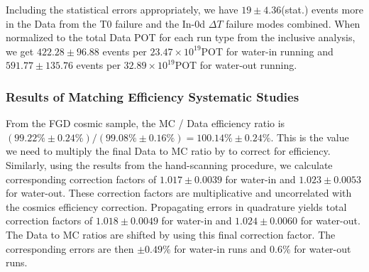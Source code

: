 Including the statistical errors appropriately, we have $19\pm 4.36$(stat.) events more in the Data from the T0 failure and the In-\p0d $\Delta T$ failure modes combined. When normalized to the total Data POT for each run type from the inclusive analysis, we get $422.28 \pm 96.88$  events per $23.47\times 10^{19}$POT for water-in running and $591.77 \pm 135.76$  events per $32.89\times 10^{19}$POT for water-out running.

\subsubsection{Results of Matching Efficiency Systematic Studies}
\label{sec:Systematics_MatchingEfficiencyResults}

From the FGD cosmic sample, the MC / Data efficiency ratio is $(99.22\%\pm 0.24\%) / (99.08\%\pm 0.16\%) = 100.14\%\pm 0.24\%$. This is the value we need to multiply the final Data to MC ratio by to correct for efficiency. Similarly, using the results from the hand-scanning procedure, we calculate corresponding correction factors of $1.017 \pm 0.0039$ for water-in and $1.023 \pm 0.0053$ for water-out. These correction factors are multiplicative and uncorrelated with the cosmics efficiency correction. Propagating errors in quadrature yields total correction factors of $1.018 \pm 0.0049$ for water-in and $1.024 \pm 0.0060$ for water-out. The Data to MC ratios are shifted by using this final correction factor. The corresponding errors are then $\pm 0.49 \%$ for water-in runs and $0.6 \%$ for water-out runs.


